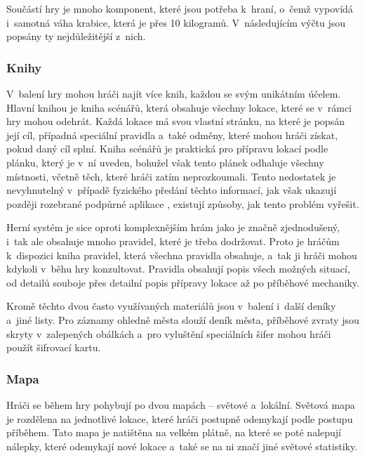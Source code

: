 Součástí hry  je mnoho komponent, které jsou potřeba k~hraní, o~čemž vypovídá i~samotná váha krabice, která je přes 10 kilogramů. V~následujícím výčtu jsou popsány ty nejdůležitější z~nich.

\subsubsection*{Knihy}
\label{subsubsec:gh_comp_books}

V~balení hry mohou hráči najít více knih, každou se svým unikátním účelem. Hlavní knihou je kniha scénářů, která obsahuje všechny lokace, které se v~rámci hry mohou odehrát. Každá lokace má svou vlastní stránku, na které je popsán její cíl, případná speciální pravidla a~také odměny, které mohou hráči získat, pokud daný cíl splní. Kniha scénářů je praktická pro přípravu lokací podle plánku, který je v~ní uveden, bohužel však tento plánek odhaluje všechny místnosti, včetně těch, které hráči zatím neprozkoumali. Tento nedostatek je nevyhnutelný v~případě fyzického předání těchto informací, jak však ukazují později rozebrané podpůrné aplikace , existují způsoby, jak tento problém vyřešit.

Herní systém  je sice oproti komplexnějším hrám jako je \dnd{} značně zjednodušený, i~tak ale obsahuje mnoho pravidel, které je třeba dodržovat. Proto je hráčům k~dispozici kniha pravidel, která všechna pravidla obsahuje, a~tak ji hráči mohou kdykoli v~běhu hry konzultovat. Pravidla obsahují popis všech možných situací, od detailů souboje přes detailní popis přípravy lokace až po příběhové mechaniky.

Kromě těchto dvou často využívaných materiálů jsou v~balení i~další deníky a~jiné listy. Pro záznamy ohledně města slouží deník města, příběhové zvraty jsou skryty v~zalepených obálkách a~pro vyluštění speciálních šifer mohou hráči použít šifrovací kartu.

\subsubsection*{Mapa}
\label{subsubsec:gh_comp_map}

Hráči se během hry pohybují po dvou mapách -- světové a~lokální. Světová mapa je rozdělena na jednotlivé lokace, které hráči postupně odemykají podle postupu příběhem. Tato mapa je natištěna na velkém plátně, na které se poté nalepují nálepky, které odemykají nové lokace a~také se na ni značí jiné světové statistiky.

